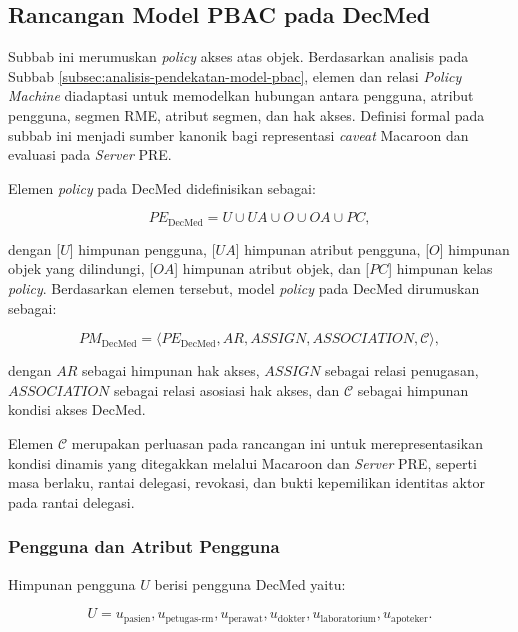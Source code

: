 \subsection{Rancangan Model PBAC pada DecMed}
\label{subsec:rancangan-model-pbac-decmed}

Subbab ini merumuskan \textit{policy} akses atas objek. Berdasarkan analisis pada Subbab \ref{subsec:analisis-pendekatan-model-pbac}, elemen dan relasi \textit{Policy Machine} diadaptasi untuk memodelkan hubungan antara pengguna, atribut pengguna, segmen RME, atribut segmen, dan hak akses. Definisi formal pada subbab ini menjadi sumber kanonik bagi representasi \textit{caveat} Macaroon dan evaluasi pada \textit{Server} PRE.

Elemen \textit{policy} pada DecMed didefinisikan sebagai:

\begin{equation}
	PE_{\text{DecMed}}
	=
	U \cup UA \cup O \cup OA \cup PC,
\end{equation}

dengan [$U$] himpunan pengguna, [$UA$] himpunan atribut pengguna, [$O$] himpunan objek yang dilindungi, [$OA$] himpunan atribut objek, dan [$PC$] himpunan kelas \textit{policy}. Berdasarkan elemen tersebut, model \textit{policy} pada DecMed dirumuskan sebagai:

\begin{equation}
	PM_{\text{DecMed}}
	=
	\langle
	PE_{\text{DecMed}},
	AR,
	ASSIGN,
	ASSOCIATION,
	\mathcal{C}
	\rangle,
\end{equation}

dengan $AR$ sebagai himpunan hak akses, $ASSIGN$ sebagai relasi penugasan, $ASSOCIATION$ sebagai relasi asosiasi hak akses, dan $\mathcal{C}$ sebagai himpunan kondisi akses DecMed.

Elemen $\mathcal{C}$ merupakan perluasan pada rancangan ini untuk merepresentasikan kondisi dinamis yang ditegakkan melalui Macaroon dan \textit{Server} PRE, seperti masa berlaku, rantai delegasi, revokasi, dan bukti kepemilikan identitas aktor pada rantai delegasi.

\subsubsection{Pengguna dan Atribut Pengguna}

Himpunan pengguna $U$ berisi pengguna DecMed yaitu:

\begin{equation}
	U =
	{
	u_{\text{pasien}},
	u_{\text{petugas-rm}},
	u_{\text{perawat}},
	u_{\text{dokter}},
	u_{\text{laboratorium}},
	u_{\text{apoteker}}
	}.
\end{equation}

